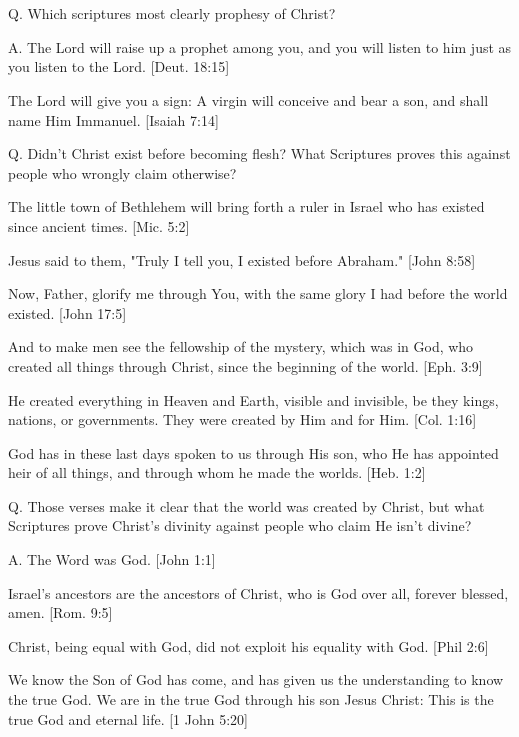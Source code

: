 \documentclass[../main.tex]{subfiles}
\begin{document}
	

	\section*{}
	Q. Which scriptures most clearly prophesy of Christ?
	
	A. The Lord will raise up a prophet among you, and you will listen to him just as you listen to the Lord. [Deut. 18:15]
	
	The Lord will give you a sign: A virgin will conceive and bear a son, and shall name Him Immanuel. [Isaiah 7:14]
	
	Q. Didn't Christ exist before becoming flesh? What Scriptures proves this against people who wrongly claim otherwise?
	
	The little town of Bethlehem will bring forth a ruler in Israel who has existed since ancient times. [Mic. 5:2]
	
	Jesus said to them, "Truly I tell you, I existed before Abraham." [John 8:58]
	
	Now, Father, glorify me through You, with the same glory I had before the world existed. [John 17:5]
	
	And to make men see the fellowship of the mystery, which was in God, who created all things through Christ, since the beginning of the world. [Eph. 3:9]
	
	He created everything in Heaven and Earth, visible and invisible, be they kings, nations, or governments. They were created by Him and for Him. [Col. 1:16]
	
	God has in these last days spoken to us through His son, who He has appointed heir of all things, and through whom he made the worlds. [Heb. 1:2]
	
	Q. Those verses make it clear that the world was created by Christ, but what Scriptures prove Christ's divinity against people who claim He isn't divine?
	
	A. The Word was God. [John 1:1]
	
	Israel's ancestors are the ancestors of Christ, who is God over all, forever blessed, amen. [Rom. 9:5]
	
	Christ, being equal with God, did not exploit his equality with God. [Phil 2:6]
	
	We know the Son of God has come, and has given us the understanding to know the true God. We are in the true God through his son Jesus Christ: This is the true God and eternal life. [1 John 5:20]
	
\end{document}

